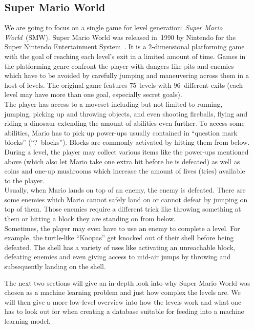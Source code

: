 \subsection{Super Mario World}

We are going to focus on a single game for level generation:
\emph{Super Mario World}~(SMW). Super Mario World was released in~1990
by Nintendo for the Super Nintendo Entertainment
System~\cite{SuperMarioWorld2019}. It is a 2-dimensional platforming
game with the goal of reaching each level's exit in a limited amount
of time. Games in the platforming genre confront the player with
dangers like pits and enemies which have to be avoided by carefully
jumping and maneuvering across them in a host of levels. The original
game features 75~levels with 96~different exits (each level may have
more than one goal, especially secret goals). \\
The player has access to a moveset including but not limited to
running, jumping, picking up and throwing objects, and even shooting
fireballs, flying and riding a dinosaur extending the amount of
abilities even further. To access some abilities, Mario has to pick up
power-ups usually contained in ``question mark blocks''
(``?~blocks''). Blocks are commonly activated by hitting them from
below. During a level, the player may collect various items like the
power-ups mentioned above (which also let Mario take one extra hit
before he is defeated) as well as coins and one-up mushrooms which
increase the amount of lives (tries) available to the player. \\
Usually, when Mario lands on top of an enemy, the enemy is defeated.
There are some enemies which Mario cannot safely land on or cannot
defeat by jumping on top of them. Those enemies require a different
trick like throwing something at them or hitting a block they are
standing on from below. \\
Sometimes, the player may even have to use an enemy to complete a
level. For example, the turtle-like ``Koopas'' get knocked out of
their shell before being defeated. The shell has a variety of uses
like activating an unreachable block, defeating enemies and even
giving access to mid-air jumps by throwing and subsequently landing on
the shell.

The next two sections will give an in-depth look into why Super Mario
World was chosen as a machine learning problem and just how complex
the levels are. We will then give a more low-level overview into how
the levels work and what one has to look out for when creating a
database suitable for feeding into a machine learning model.

